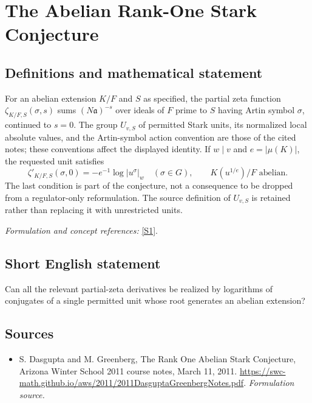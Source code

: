 \documentclass[11pt]{article}
\begin{document}
\section*{\texorpdfstring{The Abelian Rank-One Stark Conjecture}{The Abelian Rank-One Stark Conjecture}}\label{30001846}
\subsection{Definitions and mathematical statement}
For an abelian extension $K/F$ and $S$ as specified, the partial zeta function $\zeta_{K/F,S}(\sigma,s)$ sums $(N\mathfrak a)^{-s}$ over ideals of $F$ prime to $S$ having Artin symbol $\sigma$, continued to $s=0$. The group $U_{v,S}$ of permitted Stark units, its normalized local absolute values, and the Artin-symbol action convention are those of the cited notes; these conventions affect the displayed identity. If $w\mid v$ and $e=|\mu(K)|$, the requested unit satisfies
\[
 \zeta'_{K/F,S}(\sigma,0)=-e^{-1}\log|u^\sigma|_w
 \quad(\sigma\in G),\qquad K(u^{1/e})/F\text{ abelian}.
\]
The last condition is part of the conjecture, not a consequence to be dropped from a regulator-only reformulation. The source definition of $U_{v,S}$ is retained rather than replacing it with unrestricted units.
\par\smallskip\textit{Formulation and concept references:} \href{https://swc-math.github.io/aws/2011/2011DasguptaGreenbergNotes.pdf}{[S1]}.

\subsection{Short English statement}
Can all the relevant partial-zeta derivatives be realized by logarithms of conjugates of a single permitted unit whose root generates an abelian extension?
\subsection{Sources}
\begin{itemize}
\item[S1]S. Dasgupta and M. Greenberg, The Rank One Abelian Stark Conjecture, Arizona Winter School 2011 course notes, March 11, 2011.
\url{https://swc-math.github.io/aws/2011/2011DasguptaGreenbergNotes.pdf}.
\textit{Formulation source.}
\end{itemize}
\end{document}
